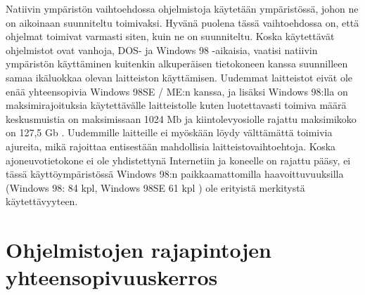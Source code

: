 


Natiivin ympäristön vaihtoehdossa ohjelmistoja käytetään ympäristössä, johon ne on aikoinaan suunniteltu toimivaksi. Hyvänä puolena tässä vaihtoehdossa on, että ohjelmat toimivat varmasti siten, kuin ne on suunniteltu. Koska käytettävät ohjelmistot ovat vanhoja, DOS- ja Windows 98 -aikaisia, vaatisi natiivin ympäristön käyttäminen kuitenkin alkuperäisen tietokoneen kanssa suunnilleen samaa ikäluokkaa olevan laitteiston käyttämisen. Uudemmat laitteistot eivät ole enää yhteensopivia Windows 98SE / ME:n kanssa, ja lisäksi Windows 98:lla on maksimirajoituksia käytettävälle laitteistolle kuten luotettavasti toimiva määrä keskusmuistia on maksimissaan 1024 Mb ja kiintolevyosiolle rajattu maksimikoko on 127,5 Gb \cite{win98:maxspecs}. Uudemmille laitteille ei myöskään löydy välttämättä toimivia ajureita, mikä rajoittaa entisestään mahdollisia laitteistovaihtoehtoja. Koska ajoneuvotietokone ei ole yhdistettynä Internetiin ja koneelle on rajattu pääsy, ei tässä käyttöympäristössä Windows 98:n paikkaamattomilla haavoittuvuuksilla (Windows 98: 84 kpl, Windows 98SE 61 kpl \cite{win98:vulns}) ole erityistä merkitystä käytettävyyteen.

\section{Ohjelmistojen rajapintojen yhteensopivuuskerros}



%

